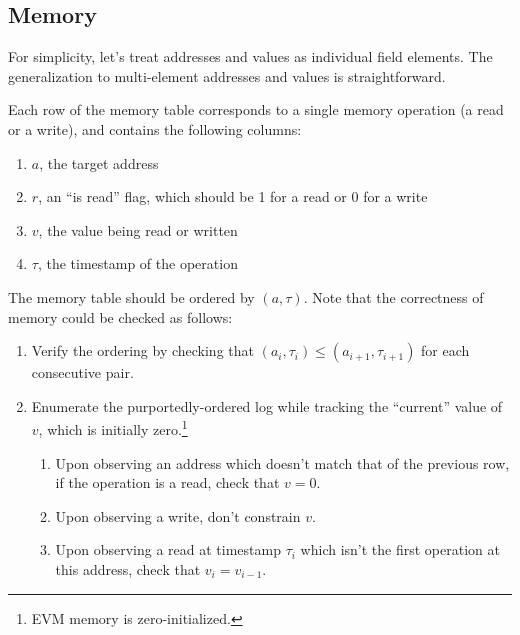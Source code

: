 \subsection{Memory}
\label{memory}

For simplicity, let's treat addresses and values as individual field elements. The generalization to multi-element addresses and values is straightforward.

Each row of the memory table corresponds to a single memory operation (a read or a write), and contains the following columns:

\begin{enumerate}
  \item $a$, the target address
  \item $r$, an ``is read'' flag, which should be 1 for a read or 0 for a write
  \item $v$, the value being read or written
  \item $\tau$, the timestamp of the operation
\end{enumerate}
The memory table should be ordered by $(a, \tau)$. Note that the correctness of memory could be checked as follows:
\begin{enumerate}
  \item Verify the ordering by checking that $(a_i, \tau_i) \leq (a_{i+1}, \tau_{i+1})$ for each consecutive pair.
  \item Enumerate the purportedly-ordered log while tracking the ``current'' value of $v$, which is initially zero.\footnote{EVM memory is zero-initialized.}
  \begin{enumerate}
    \item Upon observing an address which doesn't match that of the previous row, if the operation is a read, check that  $v = 0$.
    \item Upon observing a write, don't constrain $v$.
    \item Upon observing a read at timestamp $\tau_i$ which isn't the first operation at this address, check that $v_i = v_{i-1}$.
  \end{enumerate}
\end{enumerate}

